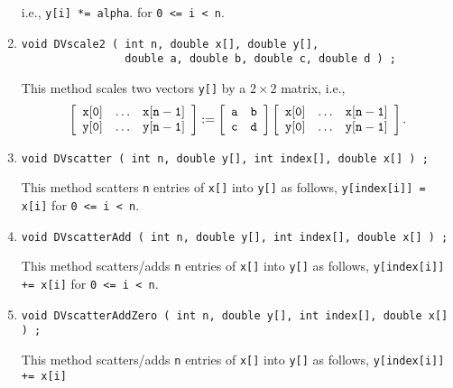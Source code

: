\begin{enumerate}
i.e.,
{\tt y[i] *= alpha}.
for {\tt 0 <= i < n}.
\item
\begin{verbatim}
void DVscale2 ( int n, double x[], double y[], 
                double a, double b, double c, double d ) ;
\end{verbatim}
This method scales two vectors {\tt y[]} by a $2 \times 2$ matrix,
i.e.,
$$
\left \lbrack \begin{array}{ccc}
{\tt x[0]} & \ldots & {\tt x[n-1]} \\
{\tt y[0]} & \ldots & {\tt y[n-1]} 
\end{array} \right \rbrack
:= 
\left \lbrack \begin{array}{cc}
{\tt a} & {\tt b} \\
{\tt c} & {\tt d}
\end{array} \right \rbrack
\left \lbrack \begin{array}{ccc}
{\tt x[0]} & \ldots & {\tt x[n-1]} \\
{\tt y[0]} & \ldots & {\tt y[n-1]} 
\end{array} \right \rbrack.
$$
\item
\begin{verbatim}
void DVscatter ( int n, double y[], int index[], double x[] ) ;
\end{verbatim}
This method scatters {\tt n} entries of {\tt x[]} into {\tt y[]} 
as follows,
{\tt y[index[i]] = x[i]} 
for {\tt 0 <= i < n}.
\item
\begin{verbatim}
void DVscatterAdd ( int n, double y[], int index[], double x[] ) ;
\end{verbatim}
This method scatters/adds {\tt n} entries of {\tt x[]} into {\tt y[]} 
as follows,
{\tt y[index[i]] += x[i]} 
for {\tt 0 <= i < n}.
\item
\begin{verbatim}
void DVscatterAddZero ( int n, double y[], int index[], double x[] ) ;
\end{verbatim}
This method scatters/adds {\tt n} entries of {\tt x[]} into {\tt y[]} 
as follows,
{\tt y[index[i]] += x[i]} 

\end{enumerate}
